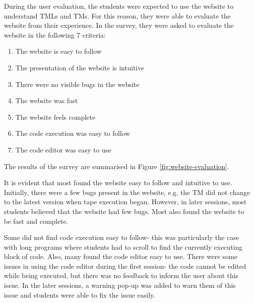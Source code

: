 During the user evaluation, the students were expected to use the website to understand TMLs and TMs. For this reason, they were able to evaluate the website from their experience. In the survey, they were asked to evaluate the website in the following 7 criteria:
\begin{enumerate}
    \item The website is easy to follow
    \item The presentation of the website is intuitive
    \item There were no visible bugs in the website
    \item The website was fast
    \item The website feels complete
    \item The code execution was easy to follow
    \item The code editor was easy to use
\end{enumerate}
The results of the survey are summarised in Figure \ref{fig:website-evaluation}. 

It is evident that most found the website easy to follow and intuitive to use. Initially, there were a few bugs present in the website, e.g. the TM did not change to the latest version when tape execution began. However, in later sessions, most students believed that the website had few bugs. Most also found the website to be fast and complete. 

Some did not find code execution easy to follow- this was particularly the case with long programs where students had to scroll to find the currently executing block of code. Also, many found the code editor easy to use. There were some issues in using the code editor during the first session- the code cannot be edited while being executed, but there was no feedback to inform the user about this issue. In the later sessions, a warning pop-up was added to warn them of this issue and students were able to fix the issue easily.


